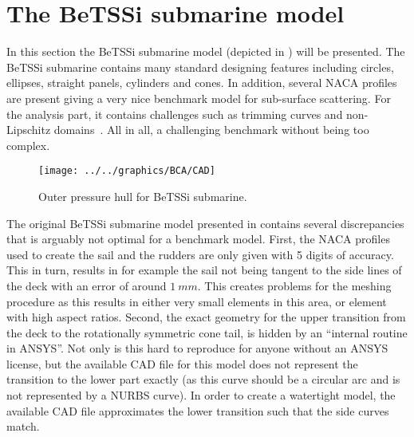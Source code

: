 \section{The BeTSSi submarine model}
\label{Sec3:BeTSSi_description}
In this section the BeTSSi \cite{Nolte2014bib} submarine model (depicted in ) will be presented. The BeTSSi submarine contains many standard designing features including circles, ellipses, straight panels, cylinders and cones. In addition, several NACA profiles are present giving a very nice benchmark model for sub-surface scattering. For the analysis part, it contains challenges such as trimming curves and non-Lipschitz domains~\cite{Lipton2010roi}. All in all, a challenging benchmark without being too complex.
\begin{figure}
	\centering
	\texttt{[image: ../../graphics/BCA/CAD]}
	\caption{Outer pressure hull for BeTSSi submarine.}
	\label{Fig3:BeTSSi_BC}
\end{figure}

The original BeTSSi submarine model presented in  \cite{Nolte2014bib} contains several discrepancies that is arguably not optimal for a benchmark model. First, the NACA profiles used to create the sail and the rudders are only given with 5 digits of accuracy. This in turn, results in for example the sail not being tangent to the side lines of the deck with an error of around $\SI{1}{mm}$. This creates problems for the meshing procedure as this results in either very small elements in this area, or element with high aspect ratios. Second, the exact geometry for the upper transition from the deck to the rotationally symmetric cone tail, is hidden by an ``internal routine in ANSYS''. Not only is this hard to reproduce for anyone without an ANSYS license, but the available CAD file for this model does not represent the transition to the lower part exactly (as this curve should be a circular arc and is not represented by a NURBS curve). In order to create a watertight model, the available CAD file approximates the lower transition such that the side curves match. 

